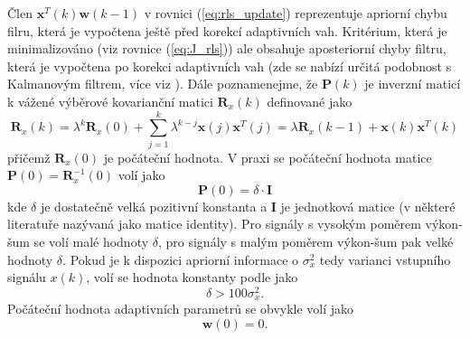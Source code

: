 Člen $\textbf{x}^T(k)\textbf{w}(k-1)$ v rovnici (\ref{eq:rls_update}) reprezentuje apriorní chybu filru, která je vypočtena ještě před korekcí adaptivních vah. Kritérium, která je minimalizováno (viz rovnice (\ref{eq:J_rls})) ale obsahuje aposteriorní chyby filtru, která je vypočtena po korekci adaptivních vah (zde se nabízí určitá podobnost s Kalmanovým filtrem, více viz \cite{rls_kalman}). 
Dále poznamenejme, že $\textbf{P}(k)$ je inverzní maticí k vážené výběrové kovarianční matici $\textbf{R}_x(k)$ definované jako
\begin{equation}
    \textbf{R}_{x}(k)=\lambda^k\textbf{R}_x(0)+ \sum_{j=1}^k \lambda^{k-j}\textbf{x}(j)\textbf{x}^T(j)=\lambda \textbf{R}_{x}(k-1)+\textbf{x}(k)\textbf{x}^T(k)
\end{equation}
přičemž $\textbf{R}_x(0)$ je počáteční hodnota. V praxi se počáteční hodnota matice $\textbf{P}(0)=\textbf{R}_x^{-1}(0)$ volí jako
\begin{equation}
    \textbf{P}(0)=\delta \cdot \textbf{I}
\end{equation}
kde $\delta$ je dostatečně velká pozitivní konstanta a $\textbf{I}$ je jednotková matice (v některé literatuře nazývaná jako matice identity). Pro signály s vysokým poměrem výkon-šum se volí malé hodnoty $\delta$, pro signály s malým poměrem výkon-šum pak velké hodnoty $\delta$. Pokud je k dispozici apriorní informace o $\sigma_x^2$ tedy varianci vstupního signálu $x(k)$, volí se hodnota konstanty podle \cite{rls_mit} jako
\begin{equation}
    \delta>100\sigma_x^2.
\end{equation}
Počáteční hodnota adaptivních parametrů se obvykle volí jako
\begin{equation}
    \textbf{w}(0)= 0.
\end{equation}

